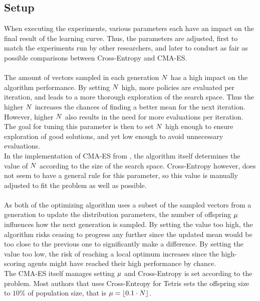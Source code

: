 \subsection{Setup}

When executing the experiments, various parameters each have 
an impact on the final result of the learning curve. Thus, the parameters
are adjusted, first to match the experiments run by other researchers, 
and later to conduct as fair as possible comparisons between 
Cross-Entropy and CMA-ES.\\
\\
The amount of vectors sampled in each generation $N$
has a high impact on the algorithm performance. By setting $N$
high, more policies are evaluated per iteration, and leads to a more thorough 
exploration of the search space. Thus the higher $N$ increases the
chances of finding a better mean for the next iteration.
However, higher $N$ also results in the
need for more evaluations per iteration. The goal for 
tuning this parameter is then
to set $N$ high enough to ensure 
exploration of good solutions, and yet 
low enough to avoid unnecessary evaluations.\\
In the implementation of CMA-ES from \shark , 
the algorithm  itself determines
the value of $N$ according to the 
size of the search space. 
Cross-Entropy however, does not seem to have a 
general rule for this parameter,
so this value is manually adjusted to fit the 
problem as well as possible.\\
\\
As both of the optimizing algorithm uses a subset of the sampled vectors
from a generation to update the distribution parameters, the number of 
offspring $\mu$ influences how the next generation is sampled.
By setting the value too high, the algorithm risks ceasing to progress any 
further since the updated mean would be too close to the previous one to 
significantly make a difference. By setting the value too low,
the risk of reaching a local optimum increases since the high-scoring agents
might have reached their high performance by chance.\\
The CMA-ES itself manages setting $\mu$ and Cross-Entropy
is set according to the problem. Most authors that uses Cross-Entropy for Tetris
sets the offspring size to $10\%$ of population size, that is 
$\mu = \lfloor 0.1 \cdot N \rfloor $.\\
